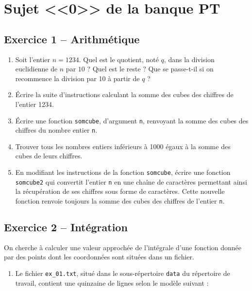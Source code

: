 \documentclass[10pt,fleqn]{article} %
\begin{document}
\normalsize

\newpage

\section{Sujet <<0>> de la banque PT}

\begin{multicols}{2}

\subsection*{Exercice 1 -- Arithmétique}
\begin{enumerate}
\item Soit l’entier $n = 1234$. Quel est le quotient, noté $q$, dans la division euclidienne de $n$ par $10$ ? Quel est
le reste ? Que se passe-t-il si on recommence la division par 10 à partir de $q$ ?
\item Écrire la suite d’instructions calculant la somme des cubes des chiffres de l’entier 1234.
\item Écrire une fonction \texttt{somcube}, d’argument \texttt{n}, renvoyant la somme des cubes des chiffres du nombre
entier \texttt{n}.
\item Trouver tous les nombres entiers inférieurs à 1000 égaux à la somme des cubes de leurs chiffres.
\item En modifiant les instructions de la fonction \texttt{somcube}, écrire une fonction \texttt{somcube2} qui convertit
l’entier \texttt{n} en une chaîne de caractères permettant ainsi la récupération de ses chiffres sous forme de
caractères. Cette nouvelle fonction renvoie toujours la somme des cubes des chiffres de l’entier \texttt{n}.
\end{enumerate}


\subsection*{Exercice 2 -- Intégration}
On cherche à calculer une valeur approchée de l’intégrale d’une fonction donnée par des points dont les coordonnées sont situées dans un fichier.
\begin{enumerate}
\item Le fichier \texttt{ex\_01.txt}, situé dans le sous-répertoire \texttt{data} du répertoire de travail, contient une quinzaine de lignes selon le modèle suivant :


\end{enumerate}
\end{multicols}
\end{document}
